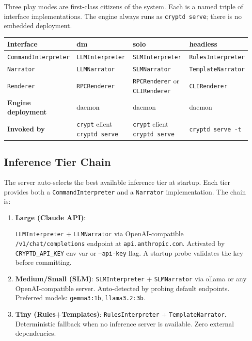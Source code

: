 \documentclass[a4paper,10pt]{article}
\newcommand{\iface}[1]{\texttt{#1}}
\newcommand{\cmd}[1]{\texttt{#1}}
\begin{document}
Three play modes are first-class citizens of the system.  Each is a
named triple of interface implementations.  The engine always runs as
\cmd{cryptd serve}; there is no embedded deployment.

\begin{center}
\small
\begin{tabular}{lp{3.2cm}p{3.2cm}p{3.2cm}}
\toprule
\textbf{Interface} & \textbf{dm} & \textbf{solo} & \textbf{headless} \\
\midrule
\iface{CommandInterpreter}
  & \texttt{LLMInterpreter}
  & \texttt{SLMInterpreter}
  & \texttt{RulesInterpreter} \\
\iface{Narrator}
  & \texttt{LLMNarrator}
  & \texttt{SLMNarrator}
  & \texttt{TemplateNarrator} \\
\iface{Renderer}
  & \texttt{RPCRenderer}
  & \texttt{RPCRenderer} or \texttt{CLIRenderer}
  & \texttt{CLIRenderer} \\
\textbf{Engine deployment}
  & daemon
  & daemon
  & daemon \\
\midrule
\textbf{Invoked by}
  & \cmd{crypt} client \textrightarrow{} \cmd{cryptd serve}
  & \cmd{crypt} client \textrightarrow{} \cmd{cryptd serve}
  & \cmd{cryptd serve -t} \\
\bottomrule
\end{tabular}
\end{center}

\subsection{Inference Tier Chain}

The server auto-selects the best available inference tier at startup.
Each tier provides both a \iface{Command\-Interpreter} and a
\iface{Narrator} implementation.  The chain is:

\begin{enumerate}
  \item \textbf{Large (Claude API)}:
    {\sloppy
    \texttt{LLM\-Interpreter} + \texttt{LLM\-Narrator} via
    OpenAI-compatible \texttt{/v1/chat/completions} endpoint at
    \texttt{api.anthropic.com}.  Activated by
    \texttt{CRYPTD\_API\_KEY} env var or \cmd{--api-key} flag.
    A startup probe validates the key before committing.\par}
  \item \textbf{Medium/Small (SLM)}: \texttt{SLMInterpreter} +
    \texttt{SLMNarrator} via ollama or any OpenAI-compatible server.
    Auto-detected by probing default endpoints.  Preferred models:
    \texttt{gemma3:1b}, \texttt{llama3.2:3b}.
  \item \textbf{Tiny (Rules+Templates)}: \texttt{RulesInterpreter} +
    \texttt{TemplateNarrator}.  Deterministic fallback when no
    inference server is available.  Zero external dependencies.
\end{enumerate}
\end{document}
